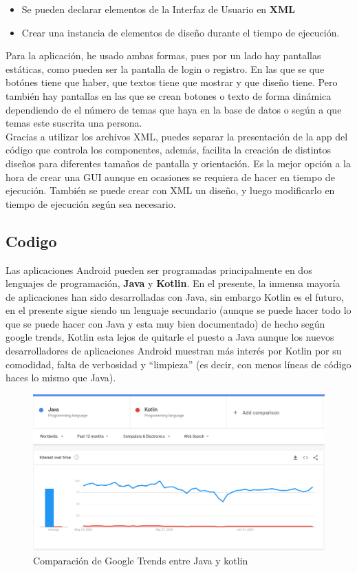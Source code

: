 \begin{itemize}
\item Se pueden declarar elementos de la Interfaz de Usuario en \textbf{XML}
\item Crear una instancia de elementos de diseño durante el tiempo de ejecución.
\end{itemize}

Para la aplicación, he usado ambas formas, pues por un lado hay pantallas estáticas, como pueden ser la pantalla de login o registro. En las que se que botónes tiene que haber, que textos tiene que mostrar y que diseño tiene. Pero también hay pantallas en las que se crean botones o texto de forma dinámica dependiendo de el número de temas que haya en la base de datos o según a que temas este suscrita una persona. \\

Gracias a utilizar los archivos XML, puedes separar la presentación de la app del código que controla los componentes, además, facilita la creación de distintos diseños para diferentes tamaños de pantalla y orientación. Es la mejor opción a la hora de crear una GUI aunque en ocasiones se requiera de hacer en tiempo de ejecución. También se puede crear con XML un diseño, y luego modificarlo en tiempo de ejecución según sea necesario. 

\subsection{Codigo} \label{sec:Codigo}

Las aplicaciones Android pueden ser programadas principalmente en dos lenguajes de programación, \textbf{Java} y \textbf{Kotlin}. En el presente, la inmensa mayoría de aplicaciones han sido desarrolladas con Java, sin embargo Kotlin es el futuro, en el presente sigue siendo un lenguaje secundario (aunque se puede hacer todo lo que se puede hacer con Java y esta muy bien documentado) de hecho según google trends, Kotlin esta lejos de quitarle el puesto a Java aunque los nuevos desarrolladores de aplicaciones Android muestran más interés por Kotlin por su comodidad, falta de verbosidad y ``limpieza'' (es decir, con menos líneas de código haces lo mismo que Java). 

\begin{figure}[h!]
  \centering
  \includegraphics[width=0.6\linewidth]{figs/Desarrollo/Popularidad}
  \caption[Java vs Kotlin]{Comparación de Google Trends entre Java y kotlin}
  \label{fig:java_vs_kotlin}
\end{figure}

